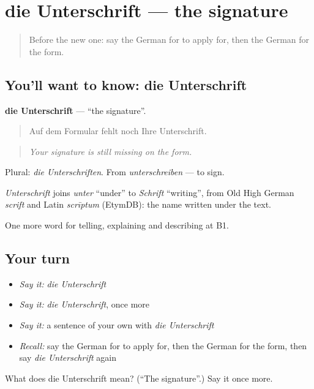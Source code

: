 \section[die Unterschrift]{die Unterschrift — the signature}

\label{lesson:GE-C383-unterschrift}



\begin{quote}
Before the new one: say the German for to apply for, then the German for the form.
\end{quote}

\subsection*{You'll want to know: die Unterschrift}
\textbf{die Unterschrift} — \textquotedblleft{}the signature\textquotedblright{}.

\begin{quote}
Auf dem Formular fehlt noch Ihre Unterschrift.
\end{quote}

\begin{quote}
\emph{Your signature is still missing on the form.}
\end{quote}

Plural: \emph{die Unterschriften}. From \emph{unterschreiben} — to sign.

\begin{cousinweb}
\emph{Unterschrift} joins \emph{unter} \textquotedblleft{}under\textquotedblright{} to \emph{Schrift} \textquotedblleft{}writing\textquotedblright{}, from Old High German \emph{scrift} and Latin \emph{scrīptum} (EtymDB): the name written under the text.
\end{cousinweb}

\begin{grammarlens}[title={What you've built}]
One more word for telling, explaining and describing at B1.
\end{grammarlens}

\subsection*{Your turn}
\begin{itemize}
\raggedright
  \item \emph{Say it:} \emph{die Unterschrift}
  \item \emph{Say it:} \emph{die Unterschrift}, once more
  \item \emph{Say it:} a sentence of your own with \emph{die Unterschrift}
  \item \emph{Recall:} say the German for to apply for, then the German for the form, then say \emph{die Unterschrift} again
\end{itemize}

\begin{tcolorbox}[breakable,colback=teal!4,colframe=teal!35!black,title={Before you move on}]
What does die Unterschrift mean? (\textquotedblleft{}The signature\textquotedblright{}.) Say it once more.
\end{tcolorbox}
